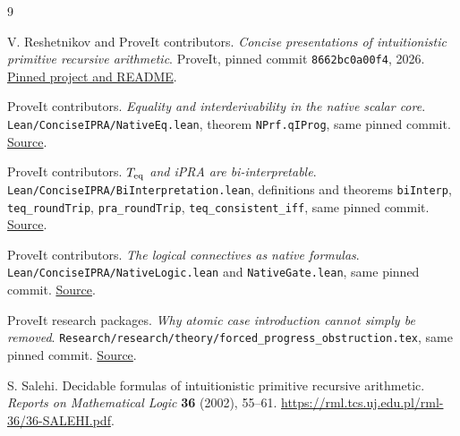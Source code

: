 \documentclass[11pt]{article}
\theoremstyle{definition}
\begin{document}
\begin{thebibliography}{9}
\raggedright
{}
V. Reshetnikov and ProveIt contributors.
\emph{Concise presentations of intuitionistic primitive recursive arithmetic}.
ProveIt, pinned commit \texttt{8662bc0a00f4}, 2026.
\href{https://github.com/VladimirReshetnikov/ProveIt/tree/8662bc0a00f4e77e482f7d141d7a4f919f70f9aa/Logic/PrimitiveRecursiveArithmetic/ConciseIPRA}{Pinned project and README}.

ProveIt contributors. \emph{Equality and interderivability in the native scalar core}.
\texttt{Lean/ConciseIPRA/NativeEq.lean}, theorem \texttt{NPrf.qIProg},
same pinned commit.
\href{https://github.com/VladimirReshetnikov/ProveIt/blob/8662bc0a00f4e77e482f7d141d7a4f919f70f9aa/Logic/PrimitiveRecursiveArithmetic/ConciseIPRA/Lean/ConciseIPRA/NativeEq.lean}{Source}.

ProveIt contributors. \emph{\(T_{\rm eq}\) and iPRA are bi-interpretable}.
\texttt{Lean/ConciseIPRA/BiInterpretation.lean}, definitions and theorems
\texttt{biInterp}, \texttt{teq\_roundTrip}, \texttt{pra\_roundTrip},
\texttt{teq\_consistent\_iff}, same pinned commit.
\href{https://github.com/VladimirReshetnikov/ProveIt/blob/8662bc0a00f4e77e482f7d141d7a4f919f70f9aa/Logic/PrimitiveRecursiveArithmetic/ConciseIPRA/Lean/ConciseIPRA/BiInterpretation.lean}{Source}.

ProveIt contributors. \emph{The logical connectives as native formulas}.
\texttt{Lean/ConciseIPRA/NativeLogic.lean} and
\texttt{NativeGate.lean}, same pinned commit.
\href{https://github.com/VladimirReshetnikov/ProveIt/blob/8662bc0a00f4e77e482f7d141d7a4f919f70f9aa/Logic/PrimitiveRecursiveArithmetic/ConciseIPRA/Lean/ConciseIPRA/NativeLogic.lean}{Source}.

ProveIt research packages. \emph{Why atomic case introduction cannot simply
be removed}. \texttt{Research/research/theory/forced\_progress\_obstruction.tex},
same pinned commit.
\href{https://github.com/VladimirReshetnikov/ProveIt/blob/8662bc0a00f4e77e482f7d141d7a4f919f70f9aa/Logic/PrimitiveRecursiveArithmetic/ConciseIPRA/Research/research/theory/forced_progress_obstruction.tex}{Source}.

S. Salehi. Decidable formulas of intuitionistic primitive recursive arithmetic.
\emph{Reports on Mathematical Logic} \textbf{36} (2002), 55--61.
\url{https://rml.tcs.uj.edu.pl/rml-36/36-SALEHI.pdf}.
\end{thebibliography}
\end{document}
